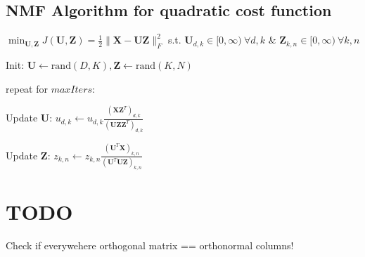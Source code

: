 \documentclass[a4paper, 11pt, landscape]{article}
\begin{document}
\begin{multicols*}{3}
\subsection{NMF Algorithm for quadratic cost function}
$\min_{\mathbf{U}, \mathbf{Z}} J(\mathbf{U}, \mathbf{Z}) = \frac{1}{2} \|\mathbf{X} - \mathbf{U}\mathbf{Z}\|_F^2$ s.t. $\mathbf{U}_{d,k} \in [0, \infty)\ \forall d, k$ \&  $\mathbf{Z}_{k, n} \in [0, \infty)\ \forall k, n$
\begin{inparaenum}
	\item Init: $\mathbf{U} \gets \mathrm{rand}(D,K), \mathbf{Z} \gets \mathrm{rand}(K,N)$
	\item repeat for $\mathit{maxIters}$:
	\item Update $\mathbf{U}$: $u_{d,k} \gets u_{d,k} \frac{(\mathbf{X}\mathbf{Z}^T)_{d,k}}{(\mathbf{U}\mathbf{Z}\mathbf{Z}^T)_{d,k}}$
	\item Update $\mathbf{Z}$: $z_{k,n} \gets z_{k,n} \frac{(\mathbf{U}^T\mathbf{X})_{k,n}}{(\mathbf{U}^T\mathbf{U}\mathbf{Z})_{k,n}}$
\end{inparaenum}


\section{TODO}
Check if everywehere orthogonal matrix == orthonormal columns!



\raggedcolumns
\end{multicols*}
\end{document}
